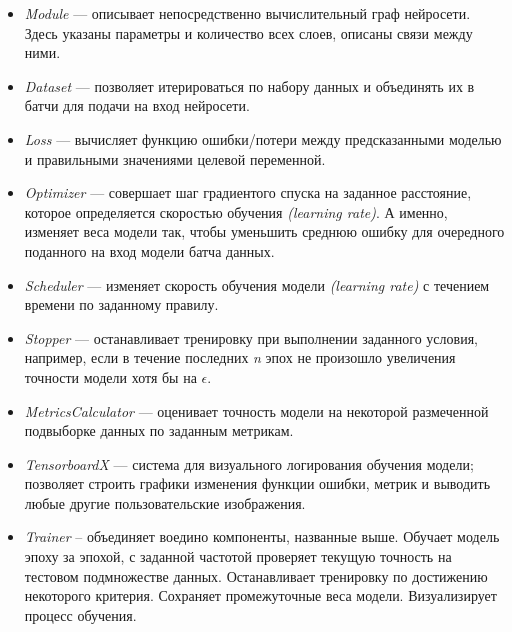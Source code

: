 \begin{itemize}

	\item
	\textit{Module} --- описывает непосредственно вычислительный граф нейросети. 
	Здесь указаны параметры и количество всех слоев, описаны связи между ними.
	
	\item
	\textit{Dataset} --- позволяет итерироваться по набору данных и объединять их в 
	батчи для подачи на вход нейросети.
	
	\item
	\textit{Loss} --- вычисляет функцию ошибки/потери между предсказанными 
	моделью  и правильными значениями целевой переменной.
	
	\item
	\textit{Optimizer} --- совершает шаг градиентого спуска на заданное расстояние,
	которое определяется скоростью обучения \textit{(learning rate)}. А именно,
	изменяет веса модели так, чтобы уменьшить среднюю ошибку для очередного
	поданного на вход модели батча данных.
	
	\item
	\textit{Scheduler} --- изменяет скорость обучения модели \textit{(learning rate)}
	с течением времени по заданному правилу.
	
	\item
	\textit{Stopper} --- останавливает тренировку при выполнении заданного 
	условия, например, если в течение последних \textit{n} эпох не произошло
	увеличения точности модели хотя бы на $\epsilon$.
	
	\item
	\textit{MetricsCalculator} --- оценивает точность модели на некоторой размеченной
	подвыборке данных по заданным метрикам.
	
	\item
	\textit{TensorboardX}  --- система для визуального логирования обучения
	модели; позволяет строить графики изменения функции ошибки, метрик и
	выводить любые другие пользовательские изображения.
	
	\item
	\textit{Trainer} -- объединяет воедино компоненты, названные выше. Обучает
	модель эпоху за эпохой, с заданной частотой проверяет текущую точность
	на тестовом подмножестве данных. Останавливает тренировку по
	достижению некоторого критерия. Сохраняет промежуточные
	веса модели. Визуализирует процесс обучения.
 
 \end{itemize}


